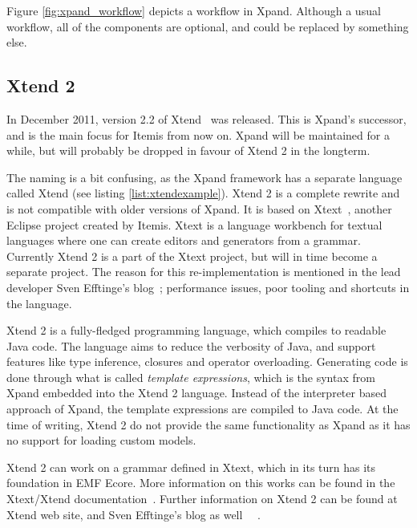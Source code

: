 Figure \ref{fig:xpand_workflow} depicts a workflow in Xpand. Although a usual workflow, all of the components are optional, and could be replaced by something else.
\newpage
\subsection{Xtend 2}\label{subsec:xtend2}
In December 2011, version 2.2 of Xtend~\cite{xtend2} was released. This is Xpand's successor, and is the main focus for Itemis from now on.  Xpand will be maintained for a while, but will probably be dropped in favour of Xtend 2 in the longterm. 

The naming is a bit confusing, as the Xpand framework has a separate language called Xtend (see listing \ref{list:xtendexample}). Xtend 2 is a complete rewrite and is not compatible with older versions of Xpand. It is based on Xtext~\cite{xtext}, another Eclipse project created by Itemis. Xtext is a language workbench for textual languages where one can create editors and generators from a grammar. Currently Xtend 2 is a part of the Xtext project, but will in time become a separate project. The reason for this re-implementation is mentioned in the lead developer Sven Efftinge's blog~\cite{efftinge_blog}; performance issues, poor tooling and shortcuts in the language.

Xtend 2 is a fully-fledged programming language, which compiles to readable Java code. The language aims to reduce the verbosity of Java, and support features like type inference, closures and operator overloading. Generating code is done through what is called \emph{template expressions}, which is the syntax from Xpand embedded into the Xtend 2 language. Instead of the interpreter based approach of Xpand, the template expressions are compiled to Java code. At the time of writing, Xtend 2 do not provide the same functionality as Xpand as it has no support for loading custom models.

Xtend 2 can work on a grammar defined in Xtext, which in its turn has its foundation in EMF Ecore. More information on this works can be found in the Xtext/Xtend documentation~\cite{xtend_codegen}. Further information on Xtend 2 can be found at Xtend web site, and Sven Efftinge's blog as well ~\cite{xtend2}~\cite{efftinge_blog}.

